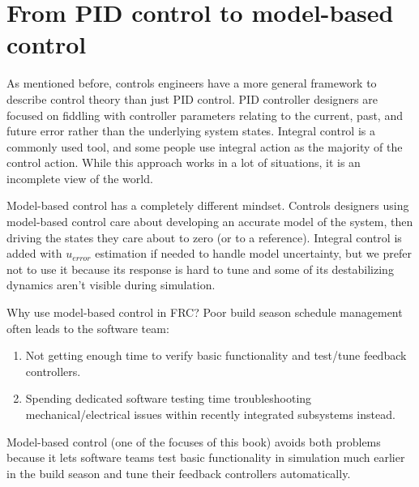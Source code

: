 \section{From PID control to model-based control}

As mentioned before, controls engineers have a more general framework to
describe control theory than just PID control. PID controller designers are
focused on fiddling with controller parameters relating to the current, past,
and future \gls{error} rather than the underlying system \glspl{state}. Integral
control is a commonly used tool, and some people use integral action as the
majority of the control action. While this approach works in a lot of
situations, it is an incomplete view of the world.

Model-based control has a completely different mindset. Controls designers using
model-based control care about developing an accurate \gls{model} of the
\gls{system}, then driving the \glspl{state} they care about to zero (or to a
\gls{reference}). Integral control is added with $u_{error}$ estimation if
needed to handle \gls{model} uncertainty, but we prefer not to use it because
its response is hard to tune and some of its destabilizing dynamics aren't
visible during simulation.

Why use model-based control in FRC? Poor build season schedule management often
leads to the software team:
\begin{enumerate}
  \item Not getting enough time to verify basic functionality and test/tune
    feedback controllers.
  \item Spending dedicated software testing time troubleshooting
    mechanical/electrical issues within recently integrated subsystems instead.
\end{enumerate}

Model-based control (one of the focuses of this book) avoids both problems
because it lets software teams test basic functionality in simulation much
earlier in the build season and tune their feedback controllers automatically.
